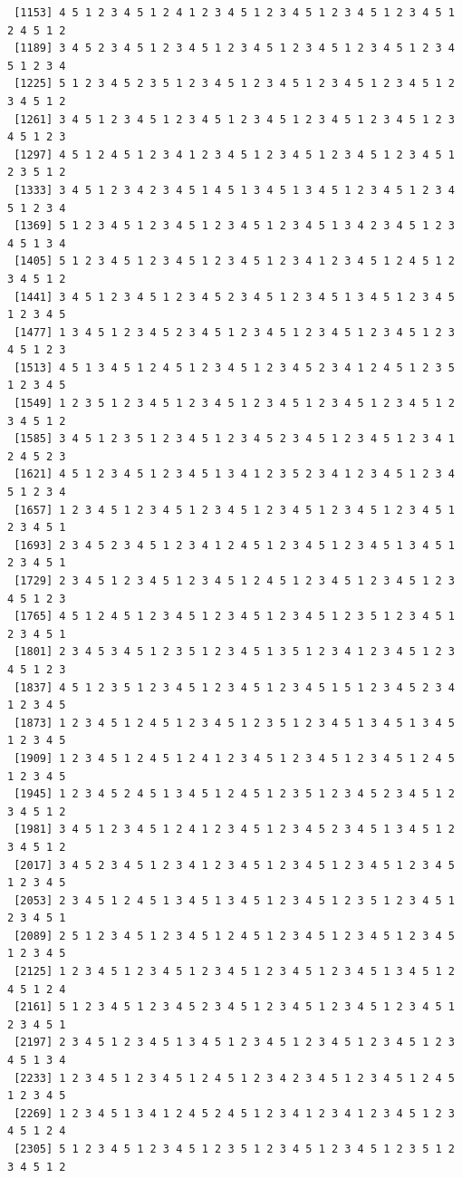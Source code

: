 \documentclass[
  11pt,
]{book}
\begin{document}
\begin{verbatim}
 [1153] 4 5 1 2 3 4 5 1 2 4 1 2 3 4 5 1 2 3 4 5 1 2 3 4 5 1 2 3 4 5 1 2 4 5 1 2
 [1189] 3 4 5 2 3 4 5 1 2 3 4 5 1 2 3 4 5 1 2 3 4 5 1 2 3 4 5 1 2 3 4 5 1 2 3 4
 [1225] 5 1 2 3 4 5 2 3 5 1 2 3 4 5 1 2 3 4 5 1 2 3 4 5 1 2 3 4 5 1 2 3 4 5 1 2
 [1261] 3 4 5 1 2 3 4 5 1 2 3 4 5 1 2 3 4 5 1 2 3 4 5 1 2 3 4 5 1 2 3 4 5 1 2 3
 [1297] 4 5 1 2 4 5 1 2 3 4 1 2 3 4 5 1 2 3 4 5 1 2 3 4 5 1 2 3 4 5 1 2 3 5 1 2
 [1333] 3 4 5 1 2 3 4 2 3 4 5 1 4 5 1 3 4 5 1 3 4 5 1 2 3 4 5 1 2 3 4 5 1 2 3 4
 [1369] 5 1 2 3 4 5 1 2 3 4 5 1 2 3 4 5 1 2 3 4 5 1 3 4 2 3 4 5 1 2 3 4 5 1 3 4
 [1405] 5 1 2 3 4 5 1 2 3 4 5 1 2 3 4 5 1 2 3 4 1 2 3 4 5 1 2 4 5 1 2 3 4 5 1 2
 [1441] 3 4 5 1 2 3 4 5 1 2 3 4 5 2 3 4 5 1 2 3 4 5 1 3 4 5 1 2 3 4 5 1 2 3 4 5
 [1477] 1 3 4 5 1 2 3 4 5 2 3 4 5 1 2 3 4 5 1 2 3 4 5 1 2 3 4 5 1 2 3 4 5 1 2 3
 [1513] 4 5 1 3 4 5 1 2 4 5 1 2 3 4 5 1 2 3 4 5 2 3 4 1 2 4 5 1 2 3 5 1 2 3 4 5
 [1549] 1 2 3 5 1 2 3 4 5 1 2 3 4 5 1 2 3 4 5 1 2 3 4 5 1 2 3 4 5 1 2 3 4 5 1 2
 [1585] 3 4 5 1 2 3 5 1 2 3 4 5 1 2 3 4 5 2 3 4 5 1 2 3 4 5 1 2 3 4 1 2 4 5 2 3
 [1621] 4 5 1 2 3 4 5 1 2 3 4 5 1 3 4 1 2 3 5 2 3 4 1 2 3 4 5 1 2 3 4 5 1 2 3 4
 [1657] 1 2 3 4 5 1 2 3 4 5 1 2 3 4 5 1 2 3 4 5 1 2 3 4 5 1 2 3 4 5 1 2 3 4 5 1
 [1693] 2 3 4 5 2 3 4 5 1 2 3 4 1 2 4 5 1 2 3 4 5 1 2 3 4 5 1 3 4 5 1 2 3 4 5 1
 [1729] 2 3 4 5 1 2 3 4 5 1 2 3 4 5 1 2 4 5 1 2 3 4 5 1 2 3 4 5 1 2 3 4 5 1 2 3
 [1765] 4 5 1 2 4 5 1 2 3 4 5 1 2 3 4 5 1 2 3 4 5 1 2 3 5 1 2 3 4 5 1 2 3 4 5 1
 [1801] 2 3 4 5 3 4 5 1 2 3 5 1 2 3 4 5 1 3 5 1 2 3 4 1 2 3 4 5 1 2 3 4 5 1 2 3
 [1837] 4 5 1 2 3 5 1 2 3 4 5 1 2 3 4 5 1 2 3 4 5 1 5 1 2 3 4 5 2 3 4 1 2 3 4 5
 [1873] 1 2 3 4 5 1 2 4 5 1 2 3 4 5 1 2 3 5 1 2 3 4 5 1 3 4 5 1 3 4 5 1 2 3 4 5
 [1909] 1 2 3 4 5 1 2 4 5 1 2 4 1 2 3 4 5 1 2 3 4 5 1 2 3 4 5 1 2 4 5 1 2 3 4 5
 [1945] 1 2 3 4 5 2 4 5 1 3 4 5 1 2 4 5 1 2 3 5 1 2 3 4 5 2 3 4 5 1 2 3 4 5 1 2
 [1981] 3 4 5 1 2 3 4 5 1 2 4 1 2 3 4 5 1 2 3 4 5 2 3 4 5 1 3 4 5 1 2 3 4 5 1 2
 [2017] 3 4 5 2 3 4 5 1 2 3 4 1 2 3 4 5 1 2 3 4 5 1 2 3 4 5 1 2 3 4 5 1 2 3 4 5
 [2053] 2 3 4 5 1 2 4 5 1 3 4 5 1 3 4 5 1 2 3 4 5 1 2 3 5 1 2 3 4 5 1 2 3 4 5 1
 [2089] 2 5 1 2 3 4 5 1 2 3 4 5 1 2 4 5 1 2 3 4 5 1 2 3 4 5 1 2 3 4 5 1 2 3 4 5
 [2125] 1 2 3 4 5 1 2 3 4 5 1 2 3 4 5 1 2 3 4 5 1 2 3 4 5 1 3 4 5 1 2 4 5 1 2 4
 [2161] 5 1 2 3 4 5 1 2 3 4 5 2 3 4 5 1 2 3 4 5 1 2 3 4 5 1 2 3 4 5 1 2 3 4 5 1
 [2197] 2 3 4 5 1 2 3 4 5 1 3 4 5 1 2 3 4 5 1 2 3 4 5 1 2 3 4 5 1 2 3 4 5 1 3 4
 [2233] 1 2 3 4 5 1 2 3 4 5 1 2 4 5 1 2 3 4 2 3 4 5 1 2 3 4 5 1 2 4 5 1 2 3 4 5
 [2269] 1 2 3 4 5 1 3 4 1 2 4 5 2 4 5 1 2 3 4 1 2 3 4 1 2 3 4 5 1 2 3 4 5 1 2 4
 [2305] 5 1 2 3 4 5 1 2 3 4 5 1 2 3 5 1 2 3 4 5 1 2 3 4 5 1 2 3 5 1 2 3 4 5 1 2

\end{verbatim}
\end{document}
